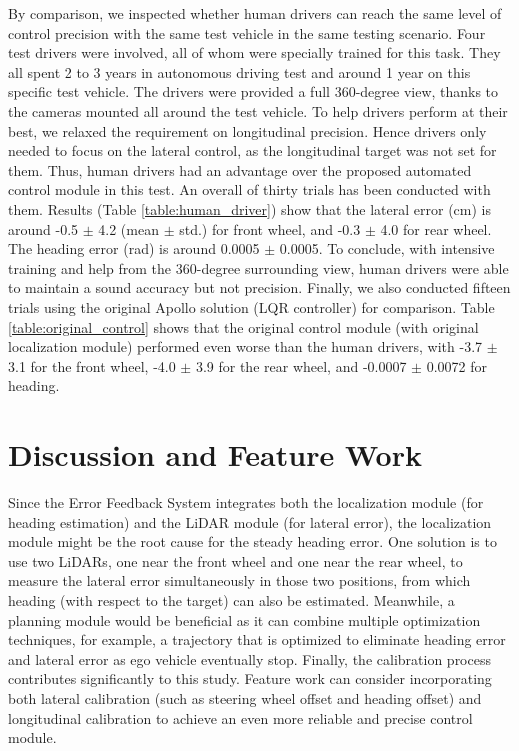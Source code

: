 \documentclass[letterpaper, 10 pt, conference]{ieeeconf}
\begin{document}
By comparison, we inspected whether human drivers can reach the same level of control precision with the same test vehicle in the same testing scenario.
Four test drivers were involved, all of whom were specially trained for this task. They all spent 2 to 3 years in autonomous driving test and around 1 year on this specific test vehicle. The drivers were provided a full 360-degree view, thanks to the cameras mounted all around the test vehicle. 
To help drivers perform at their best, we relaxed the requirement on longitudinal precision. Hence drivers only needed to focus on the lateral control, as the longitudinal target was not set for them. 
Thus, human drivers had an advantage over the proposed automated control module in this test. An overall of thirty trials has been conducted with them. Results (Table \ref{table:human_driver}) show that the lateral error (cm) is around -0.5 $\pm$ 4.2 (mean $\pm$ std.) for front wheel, and -0.3 $\pm$ 4.0 for rear wheel. The heading error (rad) is around 0.0005 $\pm$ 0.0005. 
To conclude, with intensive training and help from the 360-degree surrounding view, human drivers were able to maintain a sound accuracy but not precision. Finally, we also conducted fifteen trials using the original Apollo solution (LQR controller) for comparison. 
Table \ref{table:original_control} shows that the original control module (with original localization module) performed even worse than the human drivers, with -3.7 $\pm$ 3.1 for the front wheel, -4.0 $\pm$ 3.9 for the rear wheel, and -0.0007 $\pm$ 0.0072 for heading.


\section{Discussion and Feature Work}
Since the Error Feedback System integrates both the localization module (for heading estimation) and the LiDAR module (for lateral error), the localization module might be the root cause for the steady heading error. One solution is to use two LiDARs, one near the front wheel and one near the rear wheel, to measure the lateral error simultaneously in those two positions, from which heading  (with respect to the target) can also be estimated. 
Meanwhile, a planning module would be beneficial as it can combine multiple optimization techniques, for example, a trajectory that is optimized to eliminate heading error and lateral error as ego vehicle eventually stop. 
Finally, the calibration process contributes significantly to this study. Feature work can consider incorporating both lateral calibration (such as steering wheel offset and heading offset) and longitudinal calibration \cite{9304778} to achieve an even more reliable and precise control module. 
\end{document}

